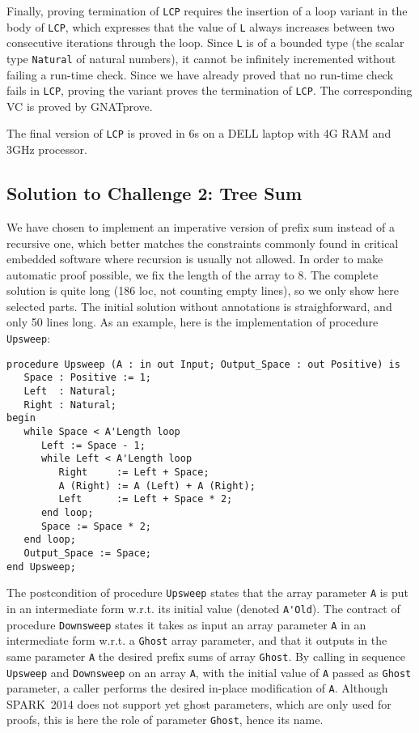 \documentclass[sttt,draft]{svjour}
\newcommand{\gnatprove}{GNATprove\xspace}
\newcommand{\newspark}{SPARK~2014\xspace}
\newcommand{\wrt}{w.r.t.\xspace}
\begin{document}
Finally, proving termination of \verb|LCP| requires the insertion of a loop
variant in the body of \verb|LCP|, which expresses that the value of \verb|L|
always increases between two consecutive iterations through the loop. Since
\verb|L| is of a bounded type (the scalar type \verb|Natural| of natural
numbers), it cannot be infinitely incremented without failing a run-time
check. Since we have already proved that no run-time check fails in \verb|LCP|,
proving the variant proves the termination of \verb|LCP|. The corresponding VC
is proved by \gnatprove.

The final version of \verb|LCP| is proved in 6s on a DELL laptop with 4G RAM
and 3GHz processor.

\subsection{Solution to Challenge 2: Tree Sum}

We have chosen to implement an imperative version of prefix sum instead of a
recursive one, which better matches the constraints commonly found in critical
embedded software where recursion is usually not allowed. In order to make
automatic proof possible, we fix the length of the array to 8. The complete
solution is quite long (186 loc, not counting empty lines), so we only show
here selected parts. The initial solution without annotations is
straighforward, and only 50 lines long. As an example, here is the
implementation of procedure \verb|Upsweep|:

\begin{footnotesize}
\begin{verbatim}
procedure Upsweep (A : in out Input; Output_Space : out Positive) is
   Space : Positive := 1;
   Left  : Natural;
   Right : Natural;
begin
   while Space < A'Length loop
      Left := Space - 1;
      while Left < A'Length loop
         Right     := Left + Space;
         A (Right) := A (Left) + A (Right);
         Left      := Left + Space * 2;
      end loop;
      Space := Space * 2;
   end loop;
   Output_Space := Space;
end Upsweep;
\end{verbatim}
\end{footnotesize}

The postcondition of procedure \verb|Upsweep| states that the array parameter
\verb|A| is put in an intermediate form \wrt its initial value (denoted
\verb|A'Old|). The contract of procedure \verb|Downsweep| states it takes as
input an array parameter \verb|A| in an intermediate form \wrt a \verb|Ghost|
array parameter, and that it outputs in the same parameter \verb|A| the desired
prefix sums of array \verb|Ghost|. By calling in sequence \verb|Upsweep| and
\verb|Downsweep| on an array \verb|A|, with the initial value of \verb|A|
passed as \verb|Ghost| parameter, a caller performs the desired in-place
modification of \verb|A|. Although \newspark does not support yet ghost
parameters, which are only used for proofs, this is here the role of parameter
\verb|Ghost|, hence its name.
\end{document}
